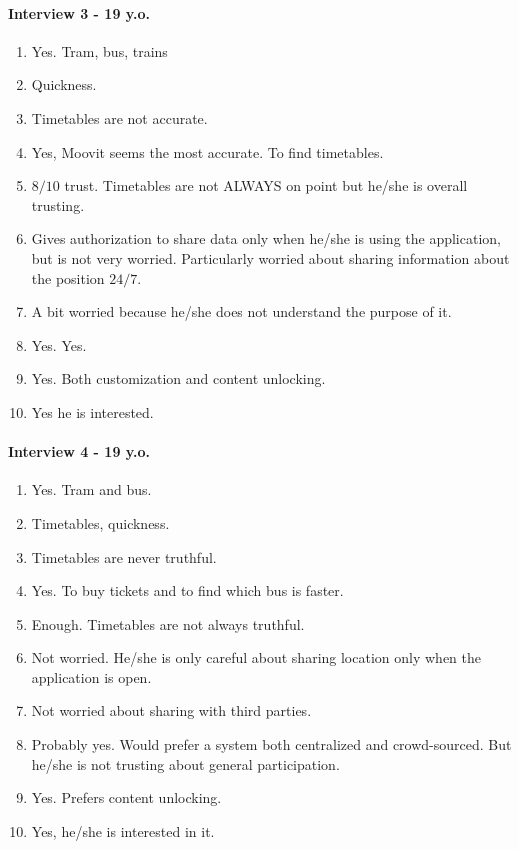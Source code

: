 \documentclass[a4paper, 10pt]{article}
\begin{document}
\paragraph*{Interview 3 - 19 y.o.}
\begin{enumerate}
    \item Yes. Tram, bus, trains
    \item Quickness.
    \item Timetables are not accurate.
    \item Yes, Moovit seems the most accurate. To find timetables.
    \item $8/10$ trust. Timetables are not ALWAYS on point but he/she is overall trusting.
    \item Gives authorization to share data only when he/she is using the application, but is not very worried. Particularly worried about sharing information about the position $24/7$.
    \item A bit worried because he/she does not understand the purpose of it.
    \item Yes. Yes.
    \item Yes. Both customization and content unlocking.
    \item Yes he is interested.
\end{enumerate}

\paragraph*{Interview 4 - 19 y.o.}
\begin{enumerate}
    \item Yes. Tram and bus.
    \item Timetables, quickness.
    \item Timetables are never truthful.
    \item Yes. To buy tickets and to find which bus is faster.
    \item Enough. Timetables are not always truthful.
    \item Not worried. He/she is only careful about sharing location only when the application is open.
    \item Not worried about sharing with third parties.
    \item Probably yes. Would prefer a system both centralized and crowd-sourced. But he/she is not trusting about general participation.
    \item Yes. Prefers content unlocking.
    \item Yes, he/she is interested in it.
\end{enumerate}
\end{document}
